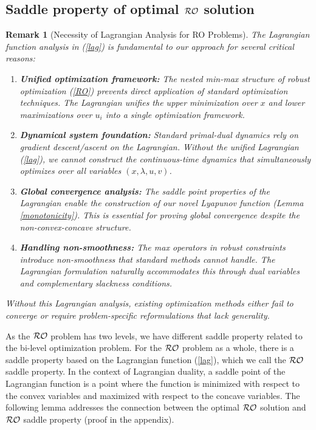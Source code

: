 \documentclass[journal,twoside,web]{ieeecolor}
\newtheorem{remark}{Remark}
\begin{document}
\subsection{{\color{blue}Saddle property of optimal ${\cal RO}$ solution}}

{\color{blue} \begin{remark}[Necessity of Lagrangian Analysis for RO Problems]
The Lagrangian function analysis in (\ref{lag}) is fundamental to our approach for several critical reasons:

\begin{enumerate}
\item \textbf{Unified optimization framework:} The nested min-max structure of robust optimization (\ref{RO}) prevents direct application of standard optimization techniques. The Lagrangian unifies the upper minimization over $x$ and lower maximizations over $u_i$ into a single optimization framework.

\item \textbf{Dynamical system foundation:} Standard primal-dual dynamics rely on gradient descent/ascent on the Lagrangian. Without the unified Lagrangian (\ref{lag}), we cannot construct the continuous-time dynamics that simultaneously optimizes over all variables $(x, \lambda, u, v)$.

\item \textbf{Global convergence analysis:} The saddle point properties of the Lagrangian enable the construction of our novel Lyapunov function (Lemma \ref{monotonicity}). This is essential for proving global convergence despite the non-convex-concave structure.

\item \textbf{Handling non-smoothness:} The max operators in robust constraints introduce non-smoothness that standard methods cannot handle. The Lagrangian formulation naturally accommodates this through dual variables and complementary slackness conditions.
\end{enumerate}

Without this Lagrangian analysis, existing optimization methods either fail to converge or require problem-specific reformulations that lack generality.
\end{remark}}

As the ${\cal RO}$ problem has two levels, we have different saddle property related to the bi-level optimization problem. For the ${\cal RO}$ problem as a whole, there is a saddle property based on the Lagrangian function (\ref{lag}), which we call the ${\cal RO}$ saddle property. In the context of Lagrangian duality, a saddle point of the Lagrangian function is a point where the function is minimized with respect to the convex variables and maximized with respect to the concave variables. The following lemma addresses the connection between the optimal ${\cal RO}$ solution and ${\cal RO}$ saddle property (proof in the appendix).
\end{document}
